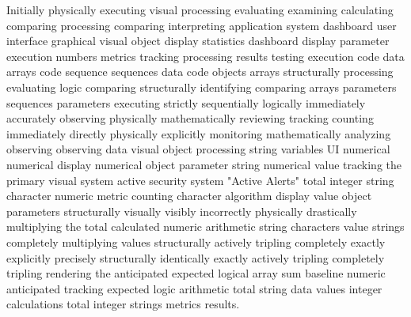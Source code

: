 Initially physically executing visual processing evaluating examining calculating comparing processing comparing interpreting application system dashboard user interface graphical visual object display statistics dashboard display parameter execution numbers metrics tracking processing results testing execution code data arrays code sequence sequences data code objects arrays structurally processing evaluating logic comparing structurally identifying comparing arrays parameters sequences parameters executing strictly sequentially logically immediately accurately observing physically mathematically reviewing tracking counting immediately directly physically explicitly monitoring mathematically analyzing observing observing data visual object processing string variables UI numerical numerical display numerical object parameter string numerical value tracking the primary visual system active security system "Active Alerts" total integer string character numeric metric counting character algorithm display value object parameters structurally visually visibly incorrectly physically drastically multiplying the total calculated numeric arithmetic string characters value strings completely multiplying values structurally actively tripling completely exactly explicitly precisely structurally identically exactly actively tripling completely tripling rendering the anticipated expected logical array sum baseline numeric anticipated tracking expected logic arithmetic total string data values integer calculations total integer strings metrics results.

